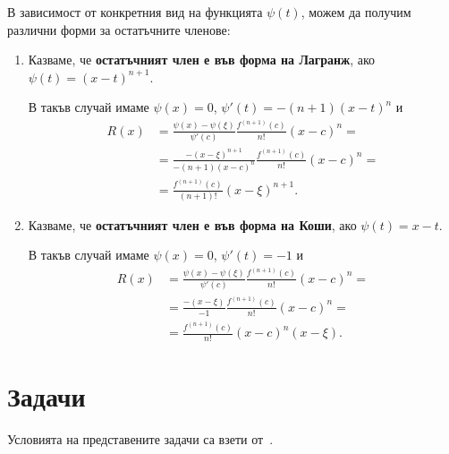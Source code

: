 \documentclass[numbers=endperiod, bibliography=totocnumbered]{scrartcl}
\begin{document}
В зависимост от конкретния вид на функцията \( \psi(t) \), можем да получим различни форми за остатъчните членове:
\begin{enumerate}
  \item Казваме, че \textbf{остатъчният член е във форма на Лагранж}, ако \( \psi(t) = {(x-t)}^{n+1} \).

  В такъв случай имаме \( \psi(x) = 0 \), \( \psi'(t) = -(n+1) {(x-t)}^n \) и
  \begin{align*}
    R(x)
    &=
    \frac {\psi(x) - \psi(\xi)} {\psi'(c)} \frac {f^{(n+1)}(c)} {n!} {(x-c)}^n
    = \\ &=
    \frac {-{(x-\xi)}^{n+1}} {-(n+1) {(x-c)}^n} \frac {f^{(n+1)}(c)} {n!} {(x-c)}^n
    = \\ &=
    \boxed{\frac {f^{(n+1)}(c)} {(n+1)!} {(x-\xi)}^{n+1}}.
  \end{align*}

  \item Казваме, че \textbf{остатъчният член е във форма на Коши}, ако \( \psi(t) = x-t \).

  В такъв случай имаме \( \psi(x) = 0 \), \( \psi'(t) = -1 \) и
  \begin{align*}
    R(x)
    &=
    \frac {\psi(x) - \psi(\xi)} {\psi'(c)} \frac {f^{(n+1)}(c)} {n!} {(x-c)}^n
    = \\ &=
    \frac {-(x-\xi)} {-1} \frac {f^{(n+1)}(c)} {n!} {(x-c)}^n
    = \\ &=
    \boxed{\frac {f^{(n+1)}(c)} {n!} {(x-c)}^n {(x-\xi)}}.
  \end{align*}
\end{enumerate}

\section{Задачи}

Условията на представените задачи са взети от~\cite{Syllabus}.
\end{document}
